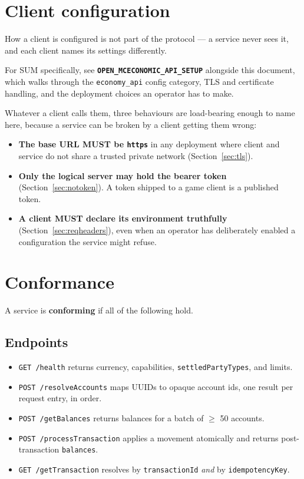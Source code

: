 \documentclass[11pt,a4paper]{article}
\newcommand{\code}[1]{\texttt{\small #1}}
\newcommand{\req}{\textbf{MUST}}
\begin{document}
\section{Client configuration}
\label{sec:config}

How a client is configured is not part of the protocol --- a service never sees it, and each
client names its settings differently.

For SUM specifically, see \textbf{\code{OPEN\_MCECONOMIC\_API\_SETUP}} alongside this document,
which walks through the \code{economy\_api} config category, TLS and certificate handling, and the
deployment choices an operator has to make.

Whatever a client calls them, three behaviours are load-bearing enough to name here, because a
service can be broken by a client getting them wrong:

\begin{itemize}
\item \textbf{The base URL \req{} be \code{https}} in any deployment where client and service do
      not share a trusted private network (Section~\ref{sec:tls}).
\item \textbf{Only the logical server may hold the bearer token}
      (Section~\ref{sec:notoken}). A token shipped to a game client is a published token.
\item \textbf{A client \req{} declare its environment truthfully}
      (Section~\ref{sec:reqheaders}), even when an operator has deliberately enabled a
      configuration the service might refuse.
\end{itemize}

\section{Conformance}
\label{sec:conformance}

A service is \textbf{conforming} if all of the following hold.

\subsection*{Endpoints}
\begin{itemize}[label=$\square$]
\item \code{GET /health} returns currency, capabilities, \code{settledPartyTypes}, and limits.
\item \code{POST /resolveAccounts} maps UUIDs to opaque account ids, one result per request entry,
      in order.
\item \code{POST /getBalances} returns balances for a batch of $\geq$ 50 accounts.
\item \code{POST /processTransaction} applies a movement atomically and returns post-transaction
      \code{balances}.
\item \code{GET /getTransaction} resolves by \code{transactionId} \emph{and} by
      \code{idempotencyKey}.
\end{itemize}
\end{document}
